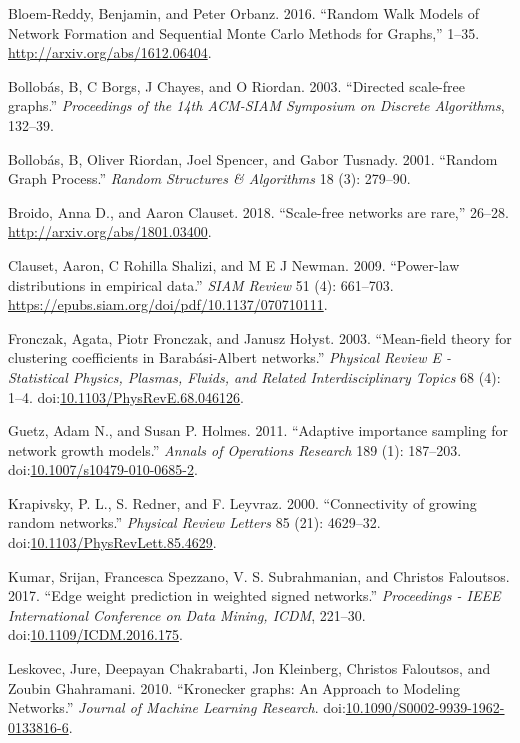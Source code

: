 \documentclass[]{elsarticle} %
\begin{document}
\hypertarget{ref-BloemReddy2016}{}
Bloem-Reddy, Benjamin, and Peter Orbanz. 2016. ``Random Walk Models of
Network Formation and Sequential Monte Carlo Methods for Graphs,''
1--35. \url{http://arxiv.org/abs/1612.06404}.

\hypertarget{ref-Bollobas2003}{}
Bollobás, B, C Borgs, J Chayes, and O Riordan. 2003. ``Directed
scale-free graphs.'' \emph{Proceedings of the 14th ACM-SIAM Symposium on
Discrete Algorithms}, 132--39.

\hypertarget{ref-Bollobas2001}{}
Bollobás, B, Oliver Riordan, Joel Spencer, and Gabor Tusnady. 2001.
``Random Graph Process.'' \emph{Random Structures \& Algorithms} 18 (3):
279--90.

\hypertarget{ref-Broido2018}{}
Broido, Anna D., and Aaron Clauset. 2018. ``Scale-free networks are
rare,'' 26--28. \url{http://arxiv.org/abs/1801.03400}.

\hypertarget{ref-Clauset2007}{}
Clauset, Aaron, C Rohilla Shalizi, and M E J Newman. 2009. ``Power-law
distributions in empirical data.'' \emph{SIAM Review} 51 (4): 661--703.
\url{https://epubs.siam.org/doi/pdf/10.1137/070710111}.

\hypertarget{ref-Fronczak2003}{}
Fronczak, Agata, Piotr Fronczak, and Janusz Hołyst. 2003. ``Mean-field
theory for clustering coefficients in Barabási-Albert networks.''
\emph{Physical Review E - Statistical Physics, Plasmas, Fluids, and
Related Interdisciplinary Topics} 68 (4): 1--4.
doi:\href{https://doi.org/10.1103/PhysRevE.68.046126}{10.1103/PhysRevE.68.046126}.

\hypertarget{ref-Guetz2011}{}
Guetz, Adam N., and Susan P. Holmes. 2011. ``Adaptive importance
sampling for network growth models.'' \emph{Annals of Operations
Research} 189 (1): 187--203.
doi:\href{https://doi.org/10.1007/s10479-010-0685-2}{10.1007/s10479-010-0685-2}.

\hypertarget{ref-Krapivsky2000}{}
Krapivsky, P. L., S. Redner, and F. Leyvraz. 2000. ``Connectivity of
growing random networks.'' \emph{Physical Review Letters} 85 (21):
4629--32.
doi:\href{https://doi.org/10.1103/PhysRevLett.85.4629}{10.1103/PhysRevLett.85.4629}.

\hypertarget{ref-Kumar2017}{}
Kumar, Srijan, Francesca Spezzano, V. S. Subrahmanian, and Christos
Faloutsos. 2017. ``Edge weight prediction in weighted signed networks.''
\emph{Proceedings - IEEE International Conference on Data Mining, ICDM},
221--30.
doi:\href{https://doi.org/10.1109/ICDM.2016.175}{10.1109/ICDM.2016.175}.

\hypertarget{ref-Leskovec2008}{}
Leskovec, Jure, Deepayan Chakrabarti, Jon Kleinberg, Christos Faloutsos,
and Zoubin Ghahramani. 2010. ``Kronecker graphs: An Approach to Modeling
Networks.'' \emph{Journal of Machine Learning Research}.
doi:\href{https://doi.org/10.1090/S0002-9939-1962-0133816-6}{10.1090/S0002-9939-1962-0133816-6}.
\end{document}
